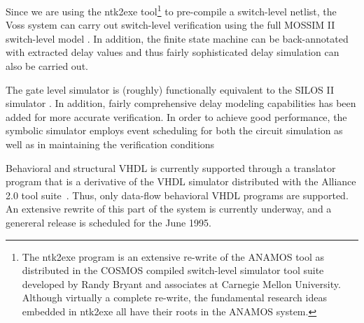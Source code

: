 Since we are using the ntk2exe tool\footnote{The ntk2exe program is
an extensive re-write of the ANAMOS%
%
{} tool as distributed in
the COSMOS%
%
{} compiled switch-level simulator tool suite developed
by Randy Bryant and associates at Carnegie Mellon University.
Although virtually a complete re-write, the fundamental research ideas
embedded in ntk2exe all have their roots in the ANAMOS system.}
to pre-compile a switch-level netlist, the Voss system can carry out
switch-level verification using the full MOSSIM II%
%
{} switch-level model%
%
{}.
In addition, the finite state machine can be back-annotated with extracted
delay values%
%
{} and thus fairly sophisticated delay simulation%
%
{} can also
be carried out.

The gate level simulator is (roughly) functionally equivalent to
the SILOS II simulator%
%
{}. In addition, fairly comprehensive delay modeling
capabilities has been added for more accurate verification. In
order to achieve good performance, the symbolic simulator employs
event scheduling for both the circuit simulation as well as in
maintaining the verification conditions

Behavioral and structural VHDL is currently supported through a
translator program that is a derivative of the VHDL simulator
distributed with the Alliance 2.0%
%
{} tool suite~\cite{Alliance}.
Thus, only data-flow behavioral VHDL programs are supported.
An extensive rewrite of this part of the system is currently
underway, and a genereral release is scheduled for the June 1995.

